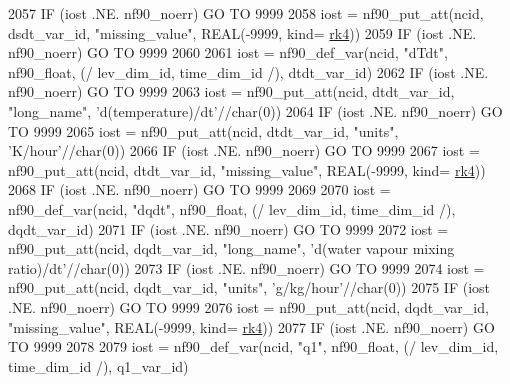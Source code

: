 \begin{DoxyCode}
2057     \textcolor{keywordflow}{IF} (iost .NE. nf90\_noerr) \textcolor{keywordflow}{GO TO} 9999
2058     iost    = nf90\_put\_att(ncid, dsdt\_var\_id, \textcolor{stringliteral}{"missing\_value"}, \textcolor{keywordtype}{REAL}(-9999, kind=
      \hyperlink{namespaceportable_abaed22a509442771d3fba69bebda0b33}{rk4}))
2059     \textcolor{keywordflow}{IF} (iost .NE. nf90\_noerr) \textcolor{keywordflow}{GO TO} 9999
2060 
2061     iost    = nf90\_def\_var(ncid, \textcolor{stringliteral}{"dTdt"}, nf90\_float, (/ lev\_dim\_id, time\_dim\_id /), dtdt\_var\_id)
2062     \textcolor{keywordflow}{IF} (iost .NE. nf90\_noerr) \textcolor{keywordflow}{GO TO} 9999
2063     iost    = nf90\_put\_att(ncid, dtdt\_var\_id, \textcolor{stringliteral}{"long\_name"}, \textcolor{stringliteral}{'d(temperature)/dt'}//char(0))
2064     \textcolor{keywordflow}{IF} (iost .NE. nf90\_noerr) \textcolor{keywordflow}{GO TO} 9999
2065     iost    = nf90\_put\_att(ncid, dtdt\_var\_id, \textcolor{stringliteral}{"units"}, \textcolor{stringliteral}{'K/hour'}//char(0))
2066     \textcolor{keywordflow}{IF} (iost .NE. nf90\_noerr) \textcolor{keywordflow}{GO TO} 9999
2067     iost    = nf90\_put\_att(ncid, dtdt\_var\_id, \textcolor{stringliteral}{"missing\_value"}, \textcolor{keywordtype}{REAL}(-9999, kind=
      \hyperlink{namespaceportable_abaed22a509442771d3fba69bebda0b33}{rk4}))
2068     \textcolor{keywordflow}{IF} (iost .NE. nf90\_noerr) \textcolor{keywordflow}{GO TO} 9999
2069 
2070     iost    = nf90\_def\_var(ncid, \textcolor{stringliteral}{"dqdt"}, nf90\_float, (/ lev\_dim\_id, time\_dim\_id /), dqdt\_var\_id)
2071     \textcolor{keywordflow}{IF} (iost .NE. nf90\_noerr) \textcolor{keywordflow}{GO TO} 9999
2072     iost    = nf90\_put\_att(ncid, dqdt\_var\_id, \textcolor{stringliteral}{"long\_name"}, \textcolor{stringliteral}{'d(water vapour mixing ratio)/dt'}//char(0))
2073     \textcolor{keywordflow}{IF} (iost .NE. nf90\_noerr) \textcolor{keywordflow}{GO TO} 9999
2074     iost    = nf90\_put\_att(ncid, dqdt\_var\_id, \textcolor{stringliteral}{"units"}, \textcolor{stringliteral}{'g/kg/hour'}//char(0))
2075     \textcolor{keywordflow}{IF} (iost .NE. nf90\_noerr) \textcolor{keywordflow}{GO TO} 9999
2076     iost    = nf90\_put\_att(ncid, dqdt\_var\_id, \textcolor{stringliteral}{"missing\_value"}, \textcolor{keywordtype}{REAL}(-9999, kind=
      \hyperlink{namespaceportable_abaed22a509442771d3fba69bebda0b33}{rk4}))
2077     \textcolor{keywordflow}{IF} (iost .NE. nf90\_noerr) \textcolor{keywordflow}{GO TO} 9999
2078 
2079     iost    = nf90\_def\_var(ncid, \textcolor{stringliteral}{"q1"}, nf90\_float, (/ lev\_dim\_id, time\_dim\_id /), q1\_var\_id)

\end{DoxyCode}
